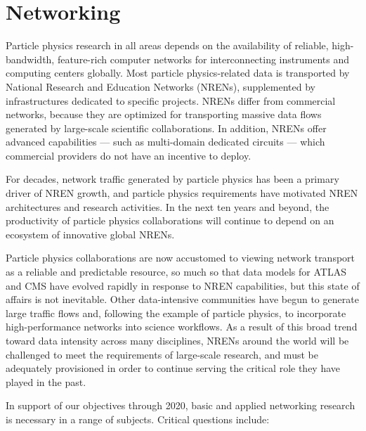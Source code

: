 \section{Networking}


Particle physics research in all areas depends on the availability of reliable, high-bandwidth, feature-rich computer networks for interconnecting instruments and computing centers globally. Most particle physics-related data is transported by National Research and Education Networks (NRENs), supplemented by infrastructures dedicated to specific projects. NRENs differ from commercial networks, because they are optimized for transporting massive data flows generated by large-scale scientific collaborations. In addition, NRENs offer advanced capabilities --- such as multi-domain dedicated circuits --- which commercial providers do not have an incentive to deploy.

For decades, network traffic generated by particle physics has been a primary driver of NREN growth, and particle physics requirements have motivated NREN architectures and research activities. In the next ten years and beyond, the productivity of particle physics collaborations will continue to depend on an ecosystem of innovative global NRENs. 

Particle physics collaborations are now accustomed to viewing network transport as a reliable and predictable resource,  so much so that data models for ATLAS and CMS have evolved rapidly in response to NREN capabilities, but this state of affairs is not inevitable. Other data-intensive communities have begun to generate large traffic flows and, following the example of particle physics, to incorporate high-performance networks into science workflows. As a result of this broad trend toward data intensity across many disciplines, NRENs around the world will be challenged to meet the requirements of large-scale research, and must be adequately provisioned in order to continue serving the critical role they have played in the past.  

In support of our objectives through 2020, basic and applied networking research is necessary in a range of subjects. Critical questions include: 

